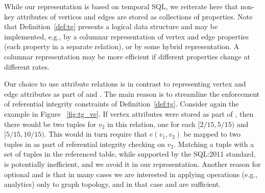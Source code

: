While our \ve representation is based on temporal SQL, we reiterate
here that non-key attributes of vertices and edges are stored as
collections of properties.  Note that Definition~\ref{def:tg} presents
a logical data structure and may be implemented, e.g., by a columnar
representation of vertex and edge properties (each property in a
separate relation), or by some hybrid representation.  A columnar
representation may be more efficient if different properties change at
different rates.


Our choice to use attribute relations is in contrast to representing
vertex and edge attributes as part of \tv and \te.  The main reason is
to streamline the enforcement of referential integrity constraints of
Definition~\ref{def:tg}.  Consider again the example in Figure
~\ref{fig:tg_ve}.  If vertex attributes were stored as part of \tv,
then there would be two tuples for $v_2$ in this relation, one for
each $[2/15, 5/15)$ and $[5/15, 10/15)$.  This would in turn require
    that $e(v_1, v_2)$ be mapped to two tuples in \tv as part of
    referential integrity checking on $v_2$.  Matching a tuple with a
    set of tuples in the referenced table, while supported by the
    SQL:2011 standard, is potentially inefficient, and we avoid it in
    our representation.
%
  Another reason for optional \tav and \tae is
that in many cases we are interested in applying operations (e.g.,
analytics) only to graph topology, and in that case \tv and \te are
sufficient.
%

